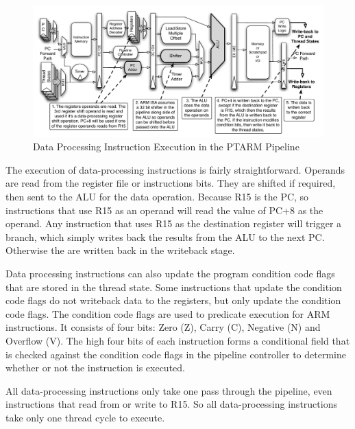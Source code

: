 \begin{figure}[h]
  \vspace{-15pt}
  \begin{center}
    \includegraphics[scale=.54]{figs/data_processing_pipeline_implementation}
  \end{center}
  \vspace{-3mm}
  \caption{Data Processing Instruction Execution in the PTARM Pipeline}
  \label{fig:data_processing_pipeline_implementation}
\end{figure}

The execution of data-processing instructions is fairly straightforward.
Operands are read from the register file or instructions bits.
They are shifted if required, then sent to the ALU for the data operation.  
Because R15 is the PC, so instructions that use R15 as an operand will read the value of PC+8 as the operand. 
Any instruction that uses R15 as the destination register will trigger a branch, which simply writes back the results from the ALU to the next PC.
Otherwise the are written back in the writeback stage. 

Data processing instructions can also update the program condition code flags that are stored in the thread state. 
Some instructions that update the condition code flags do not writeback data to the registers, but only update the condition code flags.
The condition code flags are used to predicate execution for ARM instructions.
It consists of four bits: Zero (Z), Carry (C), Negative (N) and Overflow (V). 
The high four bits of each instruction forms a conditional field that is checked against the condition code flags in the pipeline controller to determine whether or not the instruction is executed. 

All data-processing instructions only take one pass through the pipeline, even instructions that read from or write to R15.
So all data-processing instructions take only one thread cycle to execute. 

